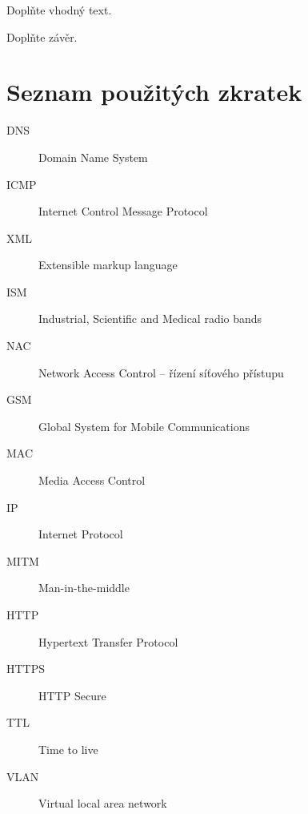 \documentclass[thesis=M,czech]{FITthesis}[2012/10/20]
\begin{document}
Doplňte vhodný text.


\begin{conclusion}
	Doplňte závěr.
	
\end{conclusion}




\appendix

\chapter{Seznam použitých zkratek}



\begin{description}
	\item[DNS] Domain Name System
	\item[ICMP] Internet Control Message Protocol
	\item[XML] Extensible markup language
	\item[ISM] Industrial, Scientific and Medical radio bands
	\item[NAC] Network Access Control -- řízení síťového přístupu
	\item[GSM] Global System for Mobile Communications
	\item[MAC] Media Access Control
	\item[IP] Internet Protocol
	\item[MITM] Man-in-the-middle
	\item[HTTP] Hypertext Transfer Protocol
	\item[HTTPS] HTTP Secure
	\item[TTL] Time to live
	\item[VLAN] Virtual local area network
\end{description}







\end{document}
